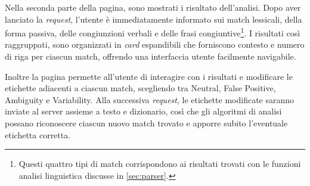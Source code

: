 \documentclass[12pt]{report}
\begin{document}
Nella seconda parte della pagina, sono mostrati i risultato dell'analisi. Dopo aver lanciato la \textit{request}, l'utente è immediatamente informato sui match lessicali, della forma passiva, delle congiunzioni verbali e delle frasi congiuntive\footnote{Questi quattro tipi di match corrispondono ai risultati trovati con le funzioni analisi linguistica discusse in \cref{sec:parser}.}. I risultati così raggruppati, sono organizzati in \textit{card} espandibili che forniscono contesto e numero di riga per ciascun match, offrendo una interfaccia utente facilmente navigabile.

Inoltre la pagina permette all'utente di interagire con i risultati e modificare le etichette adiacenti a ciascun match, scegliendo tra \textsf{Neutral}, \textsf{False Positive}, \textsf{Ambiguity} e \textsf{Variability}. Alla successiva \textit{request}, le etichette modificate saranno inviate al server assieme a testo e dizionario, così che gli algoritmi di analisi possano riconoscere ciascun nuovo match trovato e apporre subito l'eventuale etichetta corretta.
\end{document}
